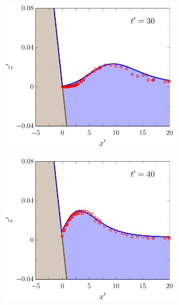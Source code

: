 \documentclass[times]{elsarticle}
\begin{document}
\begin{figure}
	\centering
	\begin{subfigure}{0.5\textwidth}
		\includegraphics[width=\textwidth]{./Figures/Experimental/Synolakis/nonbreaking/30s.pdf}
		\vspace{0.2cm}
	\end{subfigure}%
	\begin{subfigure}{0.5\textwidth}
		\includegraphics[width=\textwidth]{./Figures/Experimental/Synolakis/nonbreaking/40s.pdf}
		\vspace{0.2cm}

\end{subfigure}
\end{figure}
\end{document}
